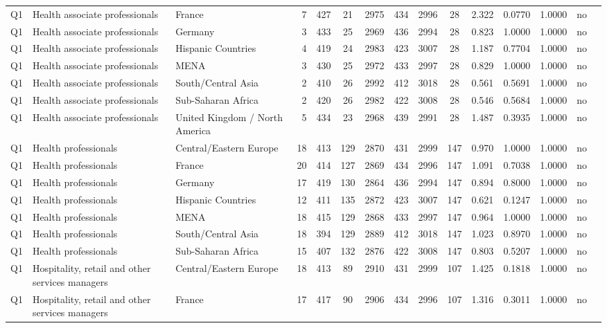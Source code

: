 \begin{longtable}{lllrcccccccccll}
Q1 & Health associate professionals & France & 7 & 427 & 21 & 2975 & 434 & 2996 & 28 & 2.322 & 0.0770 & 1.0000 & no \\
Q1 & Health associate professionals & Germany & 3 & 433 & 25 & 2969 & 436 & 2994 & 28 & 0.823 & 1.0000 & 1.0000 & no \\
Q1 & Health associate professionals & Hispanic Countries & 4 & 419 & 24 & 2983 & 423 & 3007 & 28 & 1.187 & 0.7704 & 1.0000 & no \\
Q1 & Health associate professionals & MENA & 3 & 430 & 25 & 2972 & 433 & 2997 & 28 & 0.829 & 1.0000 & 1.0000 & no \\
Q1 & Health associate professionals & South/Central Asia & 2 & 410 & 26 & 2992 & 412 & 3018 & 28 & 0.561 & 0.5691 & 1.0000 & no \\
Q1 & Health associate professionals & Sub-Saharan Africa & 2 & 420 & 26 & 2982 & 422 & 3008 & 28 & 0.546 & 0.5684 & 1.0000 & no \\
Q1 & Health associate professionals & United Kingdom / North America & 5 & 434 & 23 & 2968 & 439 & 2991 & 28 & 1.487 & 0.3935 & 1.0000 & no \\
Q1 & Health professionals & Central/Eastern Europe & 18 & 413 & 129 & 2870 & 431 & 2999 & 147 & 0.970 & 1.0000 & 1.0000 & no \\
Q1 & Health professionals & France & 20 & 414 & 127 & 2869 & 434 & 2996 & 147 & 1.091 & 0.7038 & 1.0000 & no \\
Q1 & Health professionals & Germany & 17 & 419 & 130 & 2864 & 436 & 2994 & 147 & 0.894 & 0.8000 & 1.0000 & no \\
Q1 & Health professionals & Hispanic Countries & 12 & 411 & 135 & 2872 & 423 & 3007 & 147 & 0.621 & 0.1247 & 1.0000 & no \\
Q1 & Health professionals & MENA & 18 & 415 & 129 & 2868 & 433 & 2997 & 147 & 0.964 & 1.0000 & 1.0000 & no \\
Q1 & Health professionals & South/Central Asia & 18 & 394 & 129 & 2889 & 412 & 3018 & 147 & 1.023 & 0.8970 & 1.0000 & no \\
Q1 & Health professionals & Sub-Saharan Africa & 15 & 407 & 132 & 2876 & 422 & 3008 & 147 & 0.803 & 0.5207 & 1.0000 & no \\
Q1 & Hospitality, retail and other services managers & Central/Eastern Europe & 18 & 413 & 89 & 2910 & 431 & 2999 & 107 & 1.425 & 0.1818 & 1.0000 & no \\
Q1 & Hospitality, retail and other services managers & France & 17 & 417 & 90 & 2906 & 434 & 2996 & 107 & 1.316 & 0.3011 & 1.0000 & no \\

\end{longtable}
